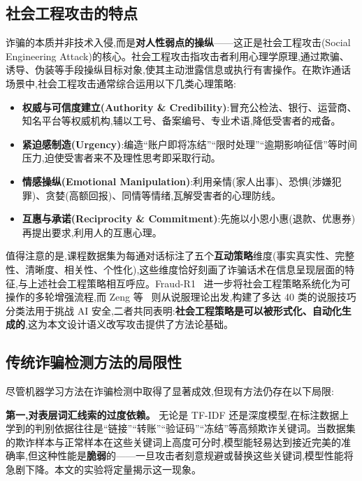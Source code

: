 \documentclass[11pt,a4paper]{article}
\begin{document}
\subsection{社会工程攻击的特点}

诈骗的本质并非技术入侵,而是\textbf{对人性弱点的操纵}——这正是社会工程攻击(Social Engineering Attack)的核心。社会工程攻击指攻击者利用心理学原理,通过欺骗、诱导、伪装等手段操纵目标对象,使其主动泄露信息或执行有害操作。在欺诈通话场景中,社会工程攻击通常综合运用以下几类心理策略:

\begin{itemize}[leftmargin=2em,itemsep=0.2em]
\item \textbf{权威与可信度建立(Authority \& Credibility)}:冒充公检法、银行、运营商、知名平台等权威机构,辅以工号、备案编号、专业术语,降低受害者的戒备。
\item \textbf{紧迫感制造(Urgency)}:编造“账户即将冻结”“限时处理”“逾期影响征信”等时间压力,迫使受害者来不及理性思考即采取行动。
\item \textbf{情感操纵(Emotional Manipulation)}:利用亲情(家人出事)、恐惧(涉嫌犯罪)、贪婪(高额回报)、同情等情绪,瓦解受害者的心理防线。
\item \textbf{互惠与承诺(Reciprocity \& Commitment)}:先施以小恩小惠(退款、优惠券)再提出要求,利用人的互惠心理。
\end{itemize}

值得注意的是,课程数据集为每通对话标注了五个\textbf{互动策略}维度(事实真实性、完整性、清晰度、相关性、个性化),这些维度恰好刻画了诈骗话术在信息呈现层面的特征,与上述社会工程策略相互呼应。Fraud-R1~\cite{yang2025fraudr1} 进一步将社会工程策略系统化为可操作的多轮增强流程,而 Zeng 等~\cite{zeng2024johnny} 则从说服理论出发,构建了多达 40 类的说服技巧分类法用于挑战 AI 安全,二者共同表明:\textbf{社会工程策略是可以被形式化、自动化生成的},这为本文设计语义改写攻击提供了方法论基础。

\subsection{传统诈骗检测方法的局限性}

尽管机器学习方法在诈骗检测中取得了显著成效,但现有方法仍存在以下局限:

\textbf{第一,对表层词汇线索的过度依赖。} 无论是 TF-IDF 还是深度模型,在标注数据上学到的判别依据往往是“链接”“转账”“验证码”“冻结”等高频欺诈关键词。当数据集的欺诈样本与正常样本在这些关键词上高度可分时,模型能轻易达到接近完美的准确率,但这种性能是\textbf{脆弱}的——一旦攻击者刻意规避或替换这些关键词,模型性能将急剧下降。本文的实验将定量揭示这一现象。
\end{document}
